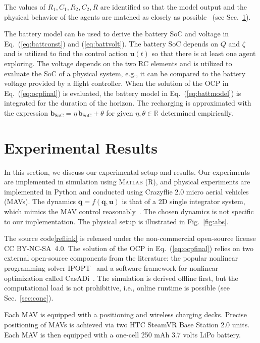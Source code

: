 \documentclass[letterpaper,10pt,conference,twoside]{IEEEtran}
\theoremstyle{definition}
\begin{document}
The values of $R_1,C_1,R_2,C_2,R$ are identified so that the model output and the physical behavior of the agents are matched as closely as possible~\cite{zhao2017observability} (see Sec.~\ref{sec:res}).

The battery model %
can be used to derive the battery SoC and voltage in Eq.~(\ref{eq:battconst}) and (\ref{eq:battvolt}). The battery SoC depends on $Q$ and $\zeta$ and is utilized to find the control action $\mathbf{u}(t)$ so that there is at least one agent exploring. %
The voltage depends on the two RC elements and is utilized to evaluate the SoC of a physical system, e.g., it can be compared to the battery voltage provided by a flight controller. 
When the solution of the OCP in Eq.~(\ref{eq:ocpfinal}) is evaluated, the battery model in Eq.~(\ref{eq:battmodel}) is integrated for the duration of the horizon. The recharging is approximated with the expression $\mathbf{b}_{\text{SoC}}=\eta\,\mathbf{b}_{\text{SoC}}+\theta$ for given $\eta,\theta\in\mathbb{R}$ determined empirically.


\section{Experimental Results}\label{sec:res}
\noindent
In this section, we discuss our experimental setup and results. Our experiments are implemented in simulation using  \textsc{Matlab} (R), and physical experiments  are implemented in Python and conducted using Crazyflie 2.0 micro aerial vehicles (MAVs). 
The dynamics $\dot{\mathbf{q}}=f(\mathbf{q},\mathbf{u})$ is that of a 2D single integrator system, which mimics the MAV control reasonably~\cite{dong2023time}. The chosen dynamics is not specific to our implementation. The physical setup is illustrated in Fig.~\ref{fig:abs}.

The source code\cref{reflink} is released under the %
non-commercial open-source license CC BY-NC-SA~4.0. The solution of the OCP in Eq.~(\ref{eq:ocpfinal}) relies on two external open-source components from the literature: the popular nonlinear programming solver IPOPT~\cite{wachter2006implementation} and a software framework for nonlinear optimization called CasADi~\cite{andersson2012casadi}. The simulation is derived offline first, but the computational load is not prohibitive, i.e., online runtime is possible (see Sec.~\ref{sec:conc}).

Each MAV is equipped with a positioning and wireless charging decks. Precise positioning of MAVs is achieved via two HTC SteamVR Base Station 2.0 units. Each MAV is then equipped with a one-cell 250 mAh 3.7 volts LiPo battery.%
\end{document}
